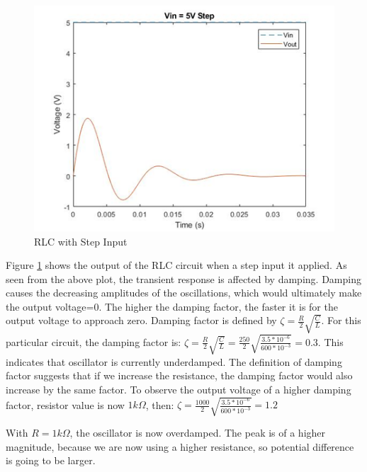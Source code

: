 \documentclass[11pt, oneside, titlepage]{article}   	%
\begin{document}
\begin{figure}[H]
\center
\includegraphics[scale = 0.5]{exercise3_2}
\caption{RLC with Step Input} \label{fig:ex3_2}
\end{figure}

Figure \ref{fig:ex3_2} shows the output of the RLC circuit when a step input it applied. As seen from the above plot, the transient response is affected by damping. Damping causes the decreasing amplitudes of the oscillations, which would ultimately make the output voltage=0. The higher the damping factor, the faster it is for the output voltage to approach zero. Damping factor is defined by $\zeta=\frac{R}{2}\sqrt{\frac{C}{L}}$. For this particular circuit, the damping factor is: $\zeta=\frac{R}{2}\sqrt{\frac{C}{L}}=\frac{250}{2}\sqrt{\frac{3.5*10^{-6}}{600*10^{-3}}}=0.3$. This indicates that oscillator is currently underdamped. 
The definition of damping factor suggests that if we increase the resistance, the damping factor would also increase by the same factor. To observe the output voltage of a higher damping factor, resistor value is now $1k\Omega$, then: $\zeta=\frac{1000}{2}\sqrt{\frac{3.5*10^{-6}}{600*10^{-3}}}=1.2$ 

With $R = 1k\Omega$, the oscillator is now overdamped. The peak is of a higher magnitude, because we are now using a higher resistance, so potential difference is going to be larger.
\end{document}

